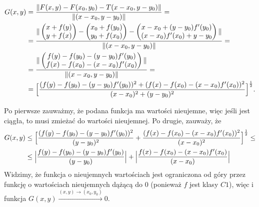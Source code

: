 \documentclass{article}[13pt]
\newcommand{\R}{\mathds{R}}
\begin{document}
\begin{align*}
    G(x,y)&={\|F(x,y)-F(x_0,y_0)-T(x-x_0,y-y_0)\|\over\|(x-x_0,y-y_0)\|}=\\
    &={\|
        \begin{pmatrix}x+f(y)\\y+f(x)\end{pmatrix}
        -\begin{pmatrix}x_0+f(y_0)\\y_0+f(x_0)\end{pmatrix}-
        \begin{pmatrix}
            x-x_0+(y-y_0)f'(y_0)\\
            (x-x_0)f'(x_0)+y-y_0
        \end{pmatrix}
    \|\over\|(x-x_0,y-y_0)\|}=\\
    &={\|
        \begin{pmatrix}
            f(y)-f(y_0)-(y-y_0)f'(y_0)\\
            f(x)-f(x_0)-(x-x_0)f'(x_0)
        \end{pmatrix}
        \|\over
        \|(x-x_0,y-y_0)\|
    }=\\
    &=\Big[{{(f(y)-f(y_0)-(y-y_0)f'(y_0))^2+(f(x)-f(x_0)-(x-x_0)f'(x_0))^2\over(x-x_0)^2+(y-y_0)^2}}\Big]^\frac12.
\end{align*}

Po pierwsze zauważmy, że podana funkcja ma wartości nieujemne, więc jeśli jest ciągła, to musi zmieżać do wartości nieujemnej. Po drugie, zauważy, że
\begin{align*}
    G(x,y)&\leq\Big[{(f(y)-f(y_0)-(y-y_0)f'(y_0))^2\over(y-y_0)^2}+{(f(x)-f(x_0)-(x-x_0)f'(x_0))^2\over(x-x_0)^2}\Big]^\frac12\leq\\
    &\leq \Big|{f(y)-f(y_0)-(y-y_0)f'(y_0)\over(y-y_0)}\Big|+\Big|{f(x)-f(x_0)-(x-x_0)f'(x_0)\over(x-x_0)}\Big|
\end{align*}
Widzimy, że funkcja o nieujemnych wartościach jest ograniczona od góry przez funkcję o wartościach nieujemnych dążącą do 0 (ponieważ $f$ jest klasy $C1$), więc i funkcja $G(x,y)\xrightarrow{(x,y)\to(x_0,y_0)}0$.

\bigskip



\end{document}
